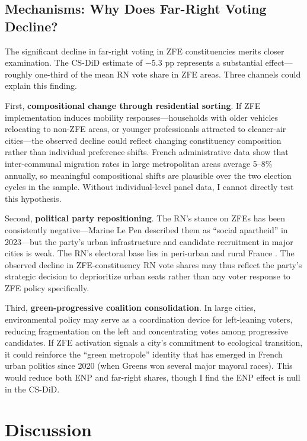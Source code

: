 \documentclass[12pt]{article}
\begin{document}
\subsection{Mechanisms: Why Does Far-Right Voting Decline?}

The significant decline in far-right voting in ZFE constituencies merits closer examination. The CS-DiD estimate of $-5.3$ pp represents a substantial effect---roughly one-third of the mean RN vote share in ZFE areas. Three channels could explain this finding.

First, \textbf{compositional change through residential sorting}. If ZFE implementation induces mobility responses---households with older vehicles relocating to non-ZFE areas, or younger professionals attracted to cleaner-air cities---the observed decline could reflect changing constituency composition rather than individual preference shifts. French administrative data show that inter-communal migration rates in large metropolitan areas average 5--8\% annually, so meaningful compositional shifts are plausible over the two election cycles in the sample. Without individual-level panel data, I cannot directly test this hypothesis.

Second, \textbf{political party repositioning}. The RN's stance on ZFEs has been consistently negative---Marine Le Pen described them as ``social apartheid'' in 2023---but the party's urban infrastructure and candidate recruitment in major cities is weak. The RN's electoral base lies in peri-urban and rural France \citep{gethin2021cleavages}. The observed decline in ZFE-constituency RN vote shares may thus reflect the party's strategic decision to deprioritize urban seats rather than any voter response to ZFE policy specifically.

Third, \textbf{green-progressive coalition consolidation}. In large cities, environmental policy may serve as a coordination device for left-leaning voters, reducing fragmentation on the left and concentrating votes among progressive candidates. If ZFE activation signals a city's commitment to ecological transition, it could reinforce the ``green metropole'' identity that has emerged in French urban politics since 2020 (when Greens won several major mayoral races). This would reduce both ENP and far-right shares, though I find the ENP effect is null in the CS-DiD.


\section{Discussion}
\end{document}
